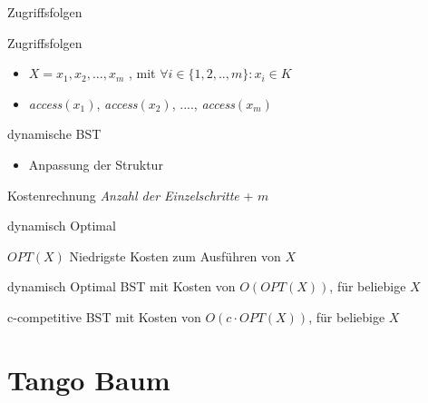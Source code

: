 \documentclass[11pt]{beamer}
\begin{document}
      
  \begin{frame} {	Zugriffsfolgen} 
    \begin{block}{Zugriffsfolgen}
    	\begin{itemize}
    		\item   $X = x_1, x_2,..., x_m$ , mit $\forall i \in \{1,2,..,m\}: x_i \in K$
    		\item  \textit{access}$\left(x_1\right)$,   \textit{access}$\left(x_2\right)$, ....,  
    		\textit{access}$\left(x_m\right)$  
    	\end{itemize}
    \end{block}			
	\pause
   \begin{block}{dynamische BST}
	 \begin{itemize}
		\item Anpassung der Struktur 	 
 	\end{itemize}
   \end{block}			
 \begin{block}{Kostenrechnung}
		\textit{Anzahl der Einzelschritte} + $m$	 
\end{block}		
\end{frame}	  
  \begin{frame} {	dynamisch Optimal} 
	\begin{block}{$\mathit{OPT}\left(X\right)$}
		Niedrigste Kosten zum Ausführen von $X$ 
	\end{block}			
	\pause
	\begin{block}{dynamisch Optimal}
	BST mit Kosten von  $O\left(\mathit{OPT}\left(X\right)\right)$, für beliebige $X$
	\end{block}			
	\begin{block}{c-competitive}
		BST mit Kosten von  $O\left(c \cdot \mathit{OPT}\left(X\right)\right)$, für beliebige $X$	 
	\end{block}		
\end{frame}	  
    
\section{Tango Baum}
\end{document}
